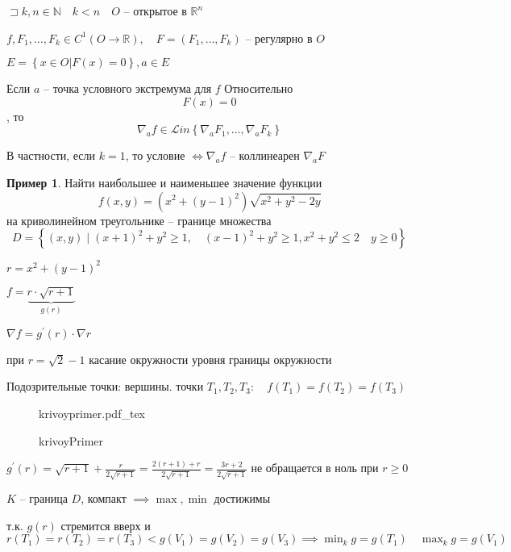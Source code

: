 \documentclass{book}
\newcommand\N{\ensuremath{\mathbb{N}}}
\newcommand\R{\ensuremath{\mathbb{R}}}
\newcommand{\p}[1]{#1^{\prime}}
\theoremstyle{definition}
\newtheorem*{example}{Пример}
\newcommand{\incfig}[1]{%
    \def\svgwidth{\columnwidth}
    {#1.pdf_tex}
}
\begin{document}
\begin{theorem}

    $\sqsupset k, n\in \N\quad k < n\quad  O$ -- открытое в $\R^n$ 

    $f, F_1, \ldots, F_k\in C^1(O\to \R), \quad F = \left( F_1, \ldots, F_k \right) $ -- регулярно в $O$

    $E = \left\{ x\in O| F(x) = 0 \right\} ,  a\in E$

    Если $a$ -- точка условного экстремума для  $f$ Относительно  \[F(x) = 0\], то \[\nabla_a f\in \mathcal Lin\left\{ \nabla _a F_1, \ldots, \nabla _a F_k \right\} \]

    В частности, если $k=1$, то условие  $\iff \nabla_af $ -- коллинеарен $\nabla _aF$
\end{theorem}

\begin{example}
    Найти наибольшее и наименьшее значение функции \[f(x,y) = (x^2  + (y-1)^2)\sqrt{x^2+y^2-2y} \] на криволинейном треугольнике -- границе множества \[ D = \left\{ (x,y)\mid (x+1)^2 + y^2\geqslant 1,\quad (x-1)^2+y^2\geqslant 1, x^2+y^2\leqslant 2\quad y\geqslant 0 \right\}  \]

    $r = x^2+(y-1)^2$

    $f = \underbrace{r\cdot \sqrt{r+1}}_{g(r)} $ 

    $\nabla f = \p g(r) \cdot  \nabla r$

    при $r = \sqrt{2} - 1 $ касание окружности уровня границы окружности 

    Подозрительные точки: вершины. точки $T_1, T_2, T_3:\quad f(T_1) = f(T_2) = f(T_3)$
\end{example}

\begin{figure}[!ht]
    \centering
    \incfig{krivoyprimer}
    \caption{krivoyPrimer}
    \label{fig:krivoyprimer}
\end{figure}

$\p g(r) = \sqrt{r+1}  + \frac{r}{2\sqrt{r+1}} = \frac{2(r+1) + r}{2\sqrt{r+1} } = \frac{3r+2}{2\sqrt{r+1} }$ не обращается в ноль при $r\geqslant 0$

$K$ -- граница  $D$, компакт $\implies \max, \min$ достижимы

т.к. $g(r)$ стремится вверх и  $r(T_1) = r(T_2) = r(T_3) < g(V_1) = g(V_2) = g(V_3) \implies \min_k g = g(T_1)\quad \max_k g = g(V_1)$
\end{document}
